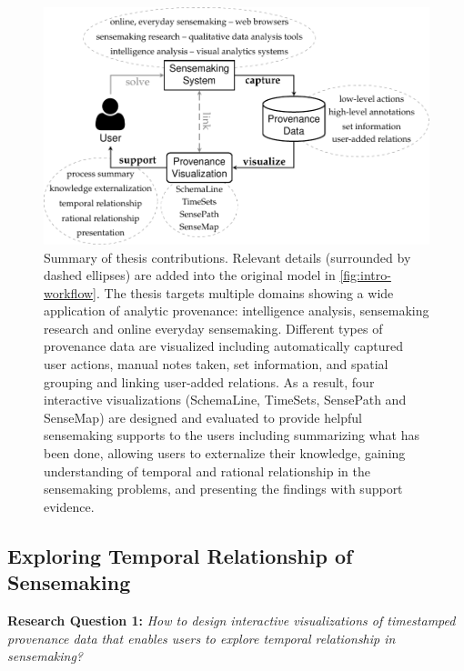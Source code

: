 \begin{figure}[!htb]
	\centering
	\includegraphics{contribution}
	\caption[Summary of thesis contributions]{Summary of thesis contributions. Relevant details (surrounded by dashed ellipses) are added into the original model in \autoref{fig:intro-workflow}. The thesis targets multiple domains showing a wide application of analytic provenance: intelligence analysis, sensemaking research and online everyday sensemaking. Different types of provenance data are visualized including automatically captured user actions, manual notes taken, set information, and spatial grouping and linking user-added relations. As a result, four interactive visualizations (SchemaLine, TimeSets, SensePath and SenseMap) are designed and evaluated to provide helpful sensemaking supports to the users including summarizing what has been done, allowing users to externalize their knowledge, gaining understanding of temporal and rational relationship in the sensemaking problems, and presenting the findings with support evidence.}
	\label{fig:con-contribution}
\end{figure}

\subsection{Exploring Temporal Relationship of Sensemaking}
\textbf{Research Question 1:} \emph{How to design interactive visualizations of timestamped provenance data that enables users to explore temporal relationship in sensemaking?}

